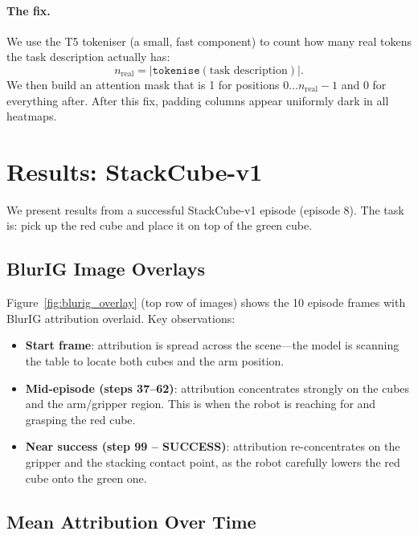 \documentclass[11pt,a4paper]{article}
\begin{document}
\paragraph{The fix.}
We use the T5 tokeniser (a small, fast component) to count how many
real tokens the task description actually has:
\begin{equation}
    n_{\mathrm{real}} = |\texttt{tokenise}(\text{task description})|.
\end{equation}
We then build an attention mask that is 1 for positions $0 \ldots n_{\mathrm{real}}-1$
and 0 for everything after. After this fix, padding columns appear uniformly
dark in all heatmaps.

\section{Results: StackCube-v1}

We present results from a successful StackCube-v1 episode (episode 8).
The task is: pick up the red cube and place it on top of the green cube.

\subsection{BlurIG Image Overlays}

Figure~\ref{fig:blurig_overlay} (top row of images) shows the 10 episode
frames with BlurIG attribution overlaid. Key observations:

\begin{itemize}
    \item \textbf{Start frame}: attribution is spread across the scene---the
          model is scanning the table to locate both cubes and the arm position.
    \item \textbf{Mid-episode (steps 37--62)}: attribution concentrates
          strongly on the cubes and the arm/gripper region. This is when the
          robot is reaching for and grasping the red cube.
    \item \textbf{Near success (step 99 -- SUCCESS)}: attribution re-concentrates
          on the gripper and the stacking contact point, as the robot carefully
          lowers the red cube onto the green one.
\end{itemize}

\subsection{Mean Attribution Over Time}
\end{document}
